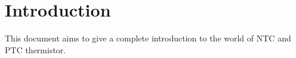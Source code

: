 \section{Introduction}
This document aims to give a complete introduction to the world of NTC and PTC thermistor.



